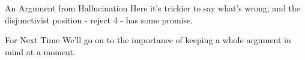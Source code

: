 \documentclass[
  17pt,
  letterpaper,
  ignorenonframetext,
  aspectratio=169,
]{beamer}
\begin{document}
\begin{frame}{An Argument from Hallucination}
\protect\hypertarget{an-argument-from-hallucination-1}{}
Here it's trickier to say what's wrong, and the disjunctivist position -
reject 4 - has some promise.
\end{frame}

\begin{frame}{For Next Time}
\protect\hypertarget{for-next-time}{}
We'll go on to the importance of keeping a whole argument in mind at a
moment.
\end{frame}
\end{document}
